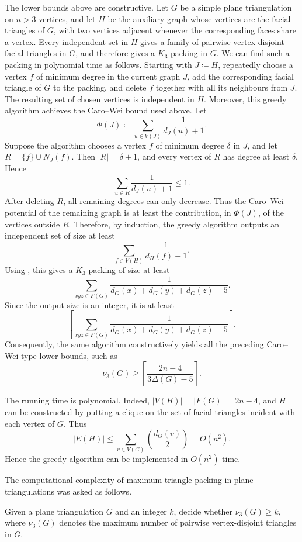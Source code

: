 \documentclass{patmorin}
\begin{document}
The lower bounds above are constructive. Let $G$ be a simple plane
triangulation on $n>3$ vertices, and let $H$ be the auxiliary graph whose
vertices are the facial triangles of $G$, with two vertices adjacent whenever
the corresponding faces share a vertex. Every independent set in $H$ gives a
family of pairwise vertex-disjoint facial triangles in $G$, and therefore gives
a $K_3$-packing in $G$.
We can find such a packing in polynomial time as follows. Starting with
$J\coloneqq H$, repeatedly choose a vertex $f$ of minimum degree in the current graph
$J$, add the corresponding facial triangle of $G$ to the packing, and delete
$f$ together with all its neighbours from $J$. The resulting set of chosen
vertices is independent in $H$.
Moreover, this greedy algorithm achieves the Caro--Wei bound used above. Let
\[
\Phi(J)\coloneqq\sum_{u\in V(J)}\frac{1}{d_J(u)+1}.
\]
Suppose the algorithm chooses a vertex $f$ of minimum degree $\delta$ in $J$,
and let $R=\{f\}\cup N_J(f)$.
Then $|R|=\delta+1$, and every vertex of $R$ has degree at least $\delta$.
Hence
\[
\sum_{u\in R}\frac{1}{d_J(u)+1}\le 1.
\]
After deleting $R$, all remaining degrees can only decrease. Thus the
Caro--Wei potential of the remaining graph is at least the contribution, in
$\Phi(J)$, of the vertices outside $R$. Therefore, by induction, the greedy algorithm outputs an independent set of size at least
\[
\sum_{f\in V(H)}\frac{1}{d_H(f)+1}.
\]
Using , this gives a $K_3$-packing of size at least
\[
\sum_{xyz\in F(G)}
\frac{1}{d_G(x)+d_G(y)+d_G(z)-5}.
\]
Since the output size is an integer, it is at least
\[
\left\lceil
\sum_{xyz\in F(G)}
\frac{1}{d_G(x)+d_G(y)+d_G(z)-5}
\right\rceil .
\]
Consequently, the same algorithm constructively yields all the preceding
Caro--Wei-type lower bounds, such as
\[
\nu_3(G)\ge
\left\lceil \frac{2n-4}{3\Delta(G)-5}\right\rceil .
\]

The running time is polynomial. Indeed, $|V(H)|=|F(G)|=2n-4$, and $H$ can be
constructed by putting a clique on the set of facial triangles incident with
each vertex of $G$. Thus
\[
|E(H)|\le \sum_{v\in V(G)} \binom{d_G(v)}{2}=O(n^2).
\]
Hence the greedy algorithm can be implemented in $O(n^2)$ time.

The computational complexity of maximum triangle packing in plane triangulations
was asked as follows.


Given a plane triangulation $G$ and an integer $k$, decide whether
$\nu_3(G)\ge k$, where $\nu_3(G)$ denotes the maximum number of pairwise
vertex-disjoint triangles in $G$.
\end{document}
